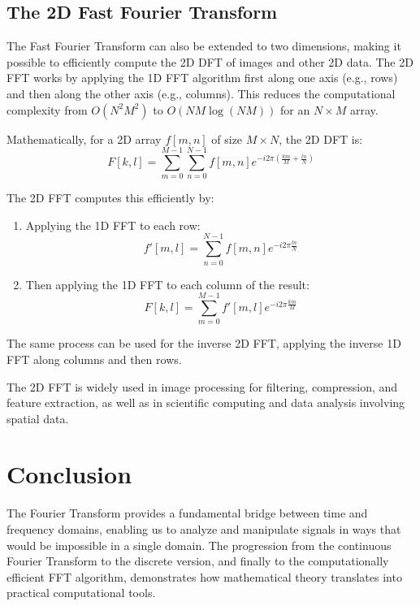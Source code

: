 \documentclass[11pt,a4paper]{article}
\begin{document}
\subsection{The 2D Fast Fourier Transform}

The Fast Fourier Transform can also be extended to two dimensions, making it possible to efficiently compute the 2D DFT of images and other 2D data. The 2D FFT works by applying the 1D FFT algorithm first along one axis (e.g., rows) and then along the other axis (e.g., columns). This reduces the computational complexity from $O(N^2 M^2)$ to $O(NM \log(NM))$ for an $N \times M$ array.

Mathematically, for a 2D array $f[m, n]$ of size $M \times N$, the 2D DFT is:
\begin{equation}
F[k, l] = \sum_{m=0}^{M-1} \sum_{n=0}^{N-1} f[m, n] e^{-i 2\pi (\frac{km}{M} + \frac{ln}{N})}
\end{equation}

The 2D FFT computes this efficiently by:
\begin{enumerate}
    \item Applying the 1D FFT to each row:
    \begin{equation}
    f'[m, l] = \sum_{n=0}^{N-1} f[m, n] e^{-i 2\pi \frac{ln}{N}}
    \end{equation}
    \item Then applying the 1D FFT to each column of the result:
    \begin{equation}
    F[k, l] = \sum_{m=0}^{M-1} f'[m, l] e^{-i 2\pi \frac{km}{M}}
    \end{equation}
\end{enumerate}

The same process can be used for the inverse 2D FFT, applying the inverse 1D FFT along columns and then rows.

The 2D FFT is widely used in image processing for filtering, compression, and feature extraction, as well as in scientific computing and data analysis involving spatial data.

\section{Conclusion}

The Fourier Transform provides a fundamental bridge between time and frequency domains, enabling us to analyze and manipulate signals in ways that would be impossible in a single domain. The progression from the continuous Fourier Transform to the discrete version, and finally to the computationally efficient FFT algorithm, demonstrates how mathematical theory translates into practical computational tools.
\end{document}
